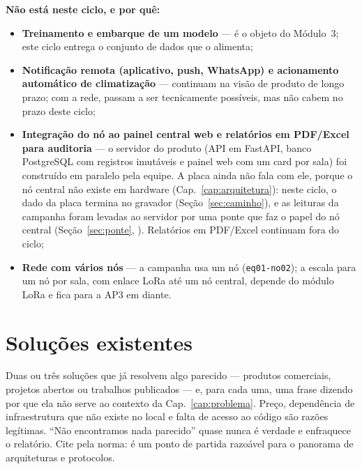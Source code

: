 \noindent\textbf{Não está neste ciclo, e por quê:}
\begin{itemize}
  \item \textbf{Treinamento e embarque de um modelo} --- é o objeto do
    Módulo~3; este ciclo entrega o conjunto de dados que o alimenta;
  \item \textbf{Notificação remota (aplicativo, push, WhatsApp) e
    acionamento automático de climatização} --- continuam na visão de
    produto de longo prazo; com a rede, passam a ser tecnicamente
    possíveis, mas não cabem no prazo deste ciclo;
  \item \textbf{Integração do nó ao painel central web e relatórios em
    PDF/Excel para auditoria} --- o servidor do produto (API em FastAPI,
    banco PostgreSQL com registros imutáveis e painel web com um card por
    sala) foi construído em paralelo pela equipe. A placa ainda não fala
    com ele, porque o nó central não existe em hardware
    (Cap.~\ref{cap:arquitetura}): neste ciclo, o dado da placa termina no
    gravador (Seção~\ref{sec:caminho}), e as leituras da campanha foram
    levadas ao servidor por uma ponte que faz o papel do nó central
    (Seção~\ref{sec:ponte}, ). Relatórios em PDF/Excel continuam
    fora do ciclo;
  \item \textbf{Rede com vários nós} --- a campanha usa
    um nó (\texttt{eq01-no02}); a escala para um nó por sala, com enlace
    LoRa até um nó central, depende do módulo LoRa e fica para a AP3 em
    diante.
\end{itemize}

\section{Soluções existentes}

\begin{orientacao}
Duas ou três soluções que já resolvem algo parecido --- produtos
comerciais, projetos abertos ou trabalhos publicados --- e, para cada
uma, uma frase dizendo por que ela não serve ao contexto da
Cap.~\ref{cap:problema}. Preço, dependência de infraestrutura que não
existe no local e falta de acesso ao código são razões legítimas.
\enquote{Não encontramos nada parecido} quase nunca é verdade e
enfraquece o relatório. Cite pela norma:  é um
ponto de partida razoável para o panorama de arquiteturas e protocolos.
\end{orientacao}

